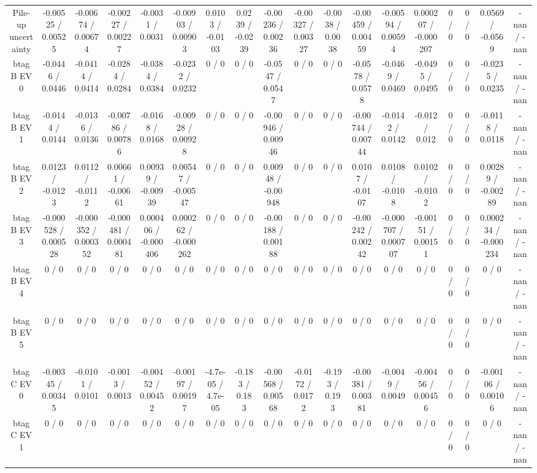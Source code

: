 \documentclass[10pt]{article}
\begin{document}
\begin{table}[htbp]
\begin{center}
\begin{tabular}{|c|c|c|c|c|c|c|c|c|c|c|c|c|c|c|c|c|c|}
  Pile-up uncertainty & -0.00525 / 0.00525 & -0.00674 / 0.00674 & -0.00227 / 0.00227 & -0.0031 / 0.0031 & -0.00903 / 0.00903 & 0.0103 / -0.0103 & 0.0239 / -0.0239 & -0.00236 / 0.00236 & -0.00327 / 0.00327 & -0.0038 / 0.0038 & -0.00459 / 0.00459 & -0.00594 / 0.00594 & 0.000207 / -0.000207 & 0 / 0 & 0 / 0 & 0.0569 / -0.0569 & -nan / -nan \\ 
  btag B EV 0 & -0.0446 / 0.0446 & -0.0414 / 0.0414 & -0.0284 / 0.0284 & -0.0384 / 0.0384 & -0.0232 / 0.0232 & 0 / 0 & 0 / 0 & -0.0547 / 0.0547 & 0 / 0 & 0 / 0 & -0.0578 / 0.0578 & -0.0469 / 0.0469 & -0.0495 / 0.0495 & 0 / 0 & 0 / 0 & -0.0235 / 0.0235 & -nan / -nan \\ 
  btag B EV 1 & -0.0144 / 0.0144 & -0.0136 / 0.0136 & -0.00786 / 0.00786 & -0.0168 / 0.0168 & -0.00928 / 0.00928 & 0 / 0 & 0 / 0 & -0.00946 / 0.00946 & 0 / 0 & 0 / 0 & -0.00744 / 0.00744 & -0.0142 / 0.0142 & -0.012 / 0.012 & 0 / 0 & 0 / 0 & -0.0118 / 0.0118 & -nan / -nan \\ 
  btag B EV 2 & 0.0123 / -0.0123 & 0.0112 / -0.0112 & 0.00661 / -0.00661 & 0.00939 / -0.00939 & 0.00547 / -0.00547 & 0 / 0 & 0 / 0 & 0.00948 / -0.00948 & 0 / 0 & 0 / 0 & 0.0107 / -0.0107 & 0.0108 / -0.0108 & 0.0102 / -0.0102 & 0 / 0 & 0 / 0 & 0.00289 / -0.00289 & -nan / -nan \\ 
  btag B EV 3 & -0.000528 / 0.000528 & -0.000352 / 0.000352 & -0.000481 / 0.000481 & 0.000406 / -0.000406 & 0.000262 / -0.000262 & 0 / 0 & 0 / 0 & -0.00188 / 0.00188 & 0 / 0 & 0 / 0 & -0.00242 / 0.00242 & -0.000707 / 0.000707 & -0.00151 / 0.00151 & 0 / 0 & 0 / 0 & 0.000234 / -0.000234 & -nan / -nan \\ 
  btag B EV 4 & 0 / 0 & 0 / 0 & 0 / 0 & 0 / 0 & 0 / 0 & 0 / 0 & 0 / 0 & 0 / 0 & 0 / 0 & 0 / 0 & 0 / 0 & 0 / 0 & 0 / 0 & 0 / 0 & 0 / 0 & 0 / 0 & -nan / -nan \\ 
  btag B EV 5 & 0 / 0 & 0 / 0 & 0 / 0 & 0 / 0 & 0 / 0 & 0 / 0 & 0 / 0 & 0 / 0 & 0 / 0 & 0 / 0 & 0 / 0 & 0 / 0 & 0 / 0 & 0 / 0 & 0 / 0 & 0 / 0 & -nan / -nan \\ 
  btag C EV 0 & -0.00345 / 0.00345 & -0.0101 / 0.0101 & -0.0013 / 0.0013 & -0.00452 / 0.00452 & -0.00197 / 0.00197 & -4.7e-05 / 4.7e-05 & -0.183 / 0.183 & -0.00568 / 0.00568 & -0.0172 / 0.0172 & -0.193 / 0.193 & -0.00381 / 0.00381 & -0.0049 / 0.0049 & -0.00456 / 0.00456 & 0 / 0 & 0 / 0 & -0.00106 / 0.00106 & -nan / -nan \\ 
  btag C EV 1 & 0 / 0 & 0 / 0 & 0 / 0 & 0 / 0 & 0 / 0 & 0 / 0 & 0 / 0 & 0 / 0 & 0 / 0 & 0 / 0 & 0 / 0 & 0 / 0 & 0 / 0 & 0 / 0 & 0 / 0 & 0 / 0 & -nan / -nan \\ 

\end{tabular}
\end{center}
\end{table}
\end{document}
